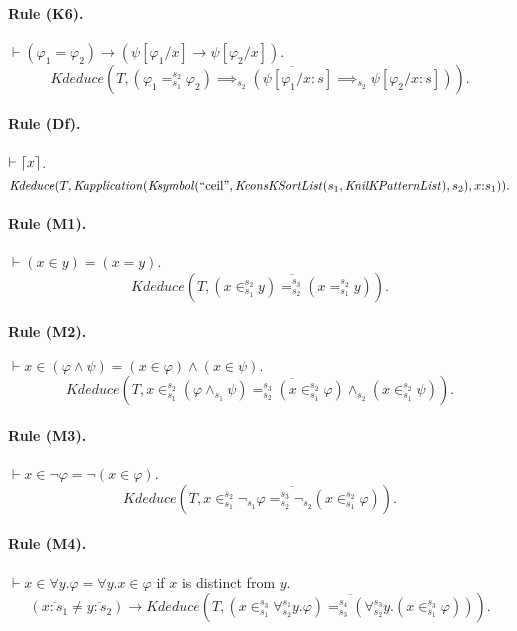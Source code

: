 \documentclass[UTF8,11pt]{article}
\theoremstyle{plain}
\theoremstyle{definition}
\theoremstyle{remark}
\newcommand{\cln}{{:}}
\DeclarePairedDelimiter{\ceil}{\lceil}{\rceil}
\newcommand{\Ksymbol}{\mathit{Ksymbol}}
\newcommand{\KnilKPatternList}{\mathit{KnilKPatternList}}
\newcommand{\KconsKSortList}{\mathit{KconsKSortList}}
\newcommand{\Kapplication}{\mathit{Kapplication}}
\newcommand{\Kdeduce}{\mathit{Kdeduce}}
\newcommand{\quot}[1]{\mathrm{``#1"}}
\begin{document}
\paragraph{Rule (K6).}
$\vdash (\varphi_1 = \varphi_2) \to (\psi[\varphi_1/x] \to \psi[\varphi_2/x])$.
\begin{equation*}
\Kdeduce(T, \overline{(\varphi_1 =_{s_1}^{s_2} \varphi_2) \implies_{s_2} (\psi[\varphi_1/x \cln s] \implies_{s_2} \psi[\varphi_2/x \cln s])}).
\end{equation*}

\paragraph{Rule (Df).}
$\vdash \ceil{x}$.
\begin{equation*}
\Kdeduce(T, \Kapplication(\Ksymbol(\quot{ceil}, \KconsKSortList(s_1, \KnilKPatternList), s_2), x \cln s_1)).
\end{equation*}

\paragraph{Rule (M1).}
$\vdash (x \in y) = (x = y)$.
\begin{equation*}
\Kdeduce(T, \overline{(x \in_{s_1}^{s_2} y) =_{s_2}^{s_3} (x =_{s_1}^{s_2} y)}).
\end{equation*}

\paragraph{Rule (M2).}
$\vdash x \in (\varphi \wedge \psi) = (x \in \varphi) \wedge (x \in \psi).$
\begin{equation*}
\Kdeduce(T, \overline{x \in_{s_1}^{s_2} (\varphi \wedge_{s_1} \psi) =_{s_2}^{s_3} (x \in_{s_1}^{s_2} \varphi) \wedge_{s_2} (x \in_{s_1}^{s_2} \psi)}).
\end{equation*}

\paragraph{Rule (M3).}
$\vdash x \in \neg \varphi = \neg (x \in \varphi)$.
\begin{equation*}
\Kdeduce(T, \overline{x \in_{s_1}^{s_2} \neg_{s_1} \varphi =_{s_2}^{s_3} \neg_{s_2} (x \in_{s_1}^{s_2} \varphi)}).
\end{equation*}

\paragraph{Rule (M4).}
$\vdash x \in \forall y . \varphi = \forall y . x \in \varphi$ if $x$ is distinct from $y$.
\begin{equation*}
(\overline{x \cln s_1} \neq \overline{y \cln s_2})  \to \Kdeduce(T, \overline{(x \in_{s_1}^{s_3} \forall_{s_2}^{s_1} y . \varphi) =_{s_3}^{s_4} (\forall_{s_2}^{s_3} y . (x \in_{s_1}^{s_3} \varphi))}).
\end{equation*}
\end{document}
